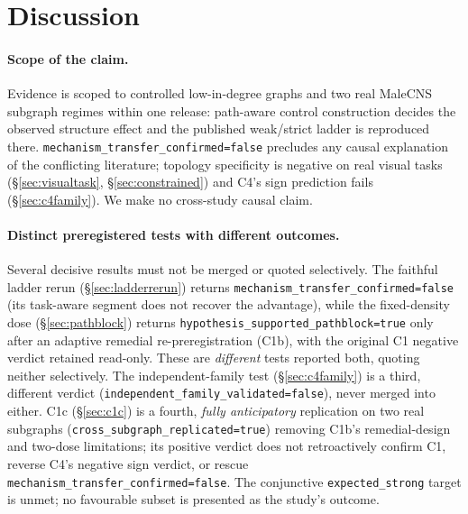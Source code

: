 \documentclass[10pt,twocolumn,letterpaper]{article}
\begin{document}
\section{Discussion}
\label{sec:discussion}

\paragraph{Scope of the claim.}
Evidence is scoped to controlled low-in-degree graphs and two real MaleCNS
subgraph regimes within one release: path-aware control construction decides
the observed structure effect and the published weak/strict ladder is
reproduced there. \texttt{mechanism\_transfer\_confirmed=false} precludes any
causal explanation of the conflicting literature; topology specificity is
negative on real visual tasks (\S\ref{sec:visualtask}, \S\ref{sec:constrained})
and C4's sign prediction fails (\S\ref{sec:c4family}). We make no cross-study
causal claim.

\paragraph{Distinct preregistered tests with different outcomes.}
Several decisive results must not be merged or quoted selectively. The faithful
ladder rerun (\S\ref{sec:ladderrerun}) returns
\texttt{mechanism\_transfer\_confirmed=false} (its task-aware segment does not
recover the advantage), while the fixed-density dose
(\S\ref{sec:pathblock}) returns
\texttt{hypothesis\_supported\_pathblock=true} only after an adaptive
remedial re-preregistration (C1b), with the original C1 negative verdict
retained read-only. These are \emph{different} tests reported both, quoting
neither selectively. The independent-family test
(\S\ref{sec:c4family}) is a third, different verdict
(\texttt{independent\_family\_validated=false}), never merged into either.
C1c (\S\ref{sec:c1c}) is a fourth, \emph{fully anticipatory} replication on
two real subgraphs (\texttt{cross\_subgraph\_replicated=true}) removing C1b's
remedial-design and two-dose limitations; its positive verdict does not
retroactively confirm C1, reverse C4's negative sign verdict, or rescue
\texttt{mechanism\_transfer\_confirmed=false}. The conjunctive
\texttt{expected\_strong} target is unmet; no favourable subset is presented
as the study's outcome.
\end{document}
